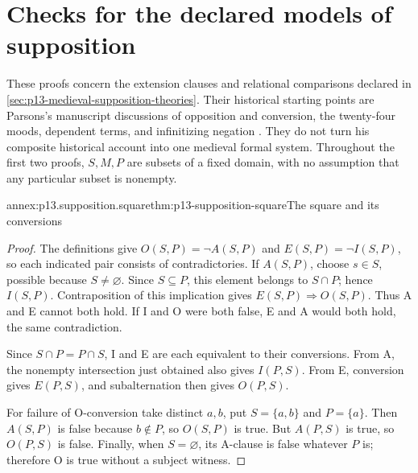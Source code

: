 \section{Checks for the declared models of supposition}
\label{sec:annex-p13-supposition}

These proofs concern the extension clauses and relational comparisons
declared in \cref{sec:p13-medieval-supposition-theories}. Their historical
starting points are Parsons's manuscript discussions of opposition and
conversion, the twenty-four moods, dependent terms, and infinitizing
negation \cite[pp.~161--168,176--179,183]{Parsons2007FordhamSupposition}.
They do not turn his composite historical account into one medieval
formal system. Throughout the first two proofs, \(S,M,P\) are subsets of
a fixed domain, with no assumption that any particular subset is nonempty.

\begin{annexitem}{annex:p13.supposition.square}{thm:p13-supposition-square}{The square and its conversions}
\begin{proof}
The definitions give \(O(S,P)=\neg A(S,P)\) and
\(E(S,P)=\neg I(S,P)\), so each indicated pair consists of
contradictories. If \(A(S,P)\), choose \(s\in S\), possible because
\(S\ne\varnothing\). Since \(S\subseteq P\), this element belongs
to \(S\cap P\); hence \(I(S,P)\). Contraposition of this implication
gives \(E(S,P)\Rightarrow O(S,P)\). Thus A and E cannot both hold.
If I and O were both false, E and A would both hold, the same contradiction.

Since \(S\cap P=P\cap S\), I and E are each equivalent to their
conversions. From A, the nonempty intersection just obtained also gives
\(I(P,S)\). From E, conversion gives \(E(P,S)\), and subalternation
then gives \(O(P,S)\).

For failure of O-conversion take distinct \(a,b\), put
\(S=\{a,b\}\) and \(P=\{a\}\). Then \(A(S,P)\) is false
because \(b\notin P\), so \(O(S,P)\) is true. But
\(A(P,S)\) is true, so \(O(P,S)\) is false. Finally, when
\(S=\varnothing\), its A-clause is false whatever \(P\) is;
therefore O is true without a subject witness.
\end{proof}
\end{annexitem}

